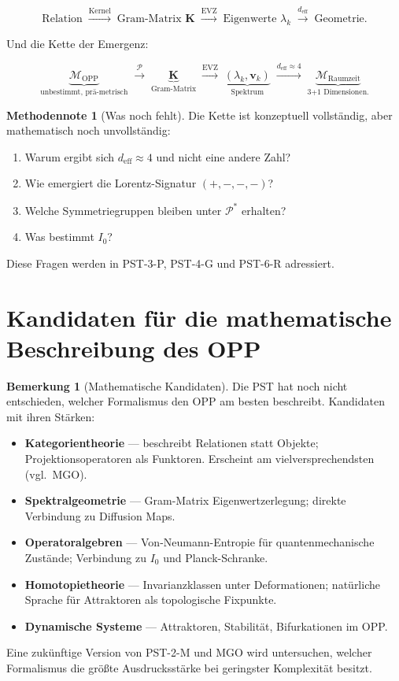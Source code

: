 \documentclass[11pt,a4paper]{article}
\theoremstyle{plain}
\theoremstyle{definition}
\newtheorem{remark}{Bemerkung}[section]
\newtheorem{methodennote}{Methodennote}[section]
\newcommand{\OPP}{\mathcal{M}_{\mathrm{OPP}}}
\newcommand{\Kmat}{\mathbf{K}}
\newcommand{\deff}{d_{\mathrm{eff}}}
\begin{document}
\[
  \text{Relation}
  \;\xrightarrow{\text{Kernel}}\;
  \text{Gram-Matrix } \Kmat
  \;\xrightarrow{\text{EVZ}}\;
  \text{Eigenwerte } \lambda_k
  \;\xrightarrow{\deff}\;
  \text{Geometrie.}
\]

Und die Kette der Emergenz:

\[
  \underbrace{\OPP}_{\text{unbestimmt, pr\"{a}-metrisch}}
  \;\xrightarrow{\mathcal{P}}\;
  \underbrace{\Kmat}_{\text{Gram-Matrix}}
  \;\xrightarrow{\text{EVZ}}\;
  \underbrace{(\lambda_k, \mathbf{v}_k)}_{\text{Spektrum}}
  \;\xrightarrow{\deff \approx 4}\;
  \underbrace{\mathcal{M}_{\text{Raumzeit}}}_{\text{3+1 Dimensionen.}}
\]

\begin{methodennote}[Was noch fehlt]
Die Kette ist konzeptuell vollst\"{a}ndig, aber mathematisch noch
unvollst\"{a}ndig:
\begin{enumerate}
  \item Warum ergibt sich $\deff \approx 4$ und nicht eine andere Zahl?
  \item Wie emergiert die Lorentz-Signatur $(+,-,-,-)$?
  \item Welche Symmetriegruppen bleiben unter $\mathcal{P}^\ast$ erhalten?
  \item Was bestimmt $I_0$?
\end{enumerate}
Diese Fragen werden in PST-3-P, PST-4-G und PST-6-R adressiert.
\end{methodennote}

\section{Kandidaten f\"{u}r die mathematische Beschreibung des OPP}

\begin{remark}[Mathematische Kandidaten]
Die PST hat noch nicht entschieden, welcher Formalismus den OPP am besten
beschreibt. Kandidaten mit ihren St\"{a}rken:
\begin{itemize}
  \item \textbf{Kategorientheorie} --- beschreibt Relationen statt
        Objekte; Projektionsoperatoren als Funktoren. Erscheint am
        vielversprechendsten (vgl.\ MGO).
  \item \textbf{Spektralgeometrie} --- Gram-Matrix Eigenwertzerlegung;
        direkte Verbindung zu Diffusion Maps.
  \item \textbf{Operatoralgebren} --- Von-Neumann-Entropie f\"{u}r
        quantenmechanische Zust\"{a}nde; Verbindung zu $I_0$ und
        Planck-Schranke.
  \item \textbf{Homotopietheorie} --- Invarianzklassen unter
        Deformationen; nat\"{u}rliche Sprache f\"{u}r Attraktoren
        als topologische Fixpunkte.
  \item \textbf{Dynamische Systeme} --- Attraktoren, Stabilit\"{a}t,
        Bifurkationen im OPP.
\end{itemize}
Eine zuk\"{u}nftige Version von PST-2-M und MGO wird untersuchen, welcher
Formalismus die gr\"{o}\ss{}te Ausdrucksst\"{a}rke bei geringster
Komplexit\"{a}t besitzt.
\end{remark}
\end{document}
